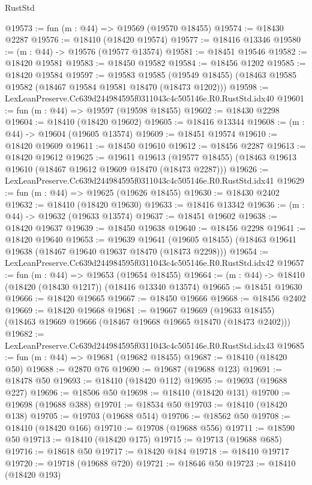 \begin{lexlean}{RustStd}
\begin{coremodule}
@19573 := fun (m : @44) => @19569 (@19570 @18455)
@19574 := @18430 @2287
@19576 := @18410 (@18420 @19574)
@19577 := @18416 @13346
@19580 := (m : @44) -> @19576 (@19577 @13574)
@19581 := @18451 @19546
@19582 := @18420 @19581
@19583 := @18450 @19582
@19584 := @18456 @1202
@19585 := @18420 @19584
@19597 := @19583
    @19585
    (@19549 @18455)
    (@18463 @19585 @19582 (@18467 @19584 @19581 @18470 (@18473 @1202)))
@19598 := LexLeanPreserve.Cc639d244984595f0311043c4c505146e.R0.RustStd.idx40
@19601 := fun (m : @44) => @19597 (@19598 @18455)
@19602 := @18430 @2298
@19604 := @18410 (@18420 @19602)
@19605 := @18416 @13344
@19608 := (m : @44) -> @19604 (@19605 @13574)
@19609 := @18451 @19574
@19610 := @18420 @19609
@19611 := @18450 @19610
@19612 := @18456 @2287
@19613 := @18420 @19612
@19625 := @19611
    @19613
    (@19577 @18455)
    (@18463 @19613 @19610 (@18467 @19612 @19609 @18470 (@18473 @2287)))
@19626 := LexLeanPreserve.Cc639d244984595f0311043c4c505146e.R0.RustStd.idx41
@19629 := fun (m : @44) => @19625 (@19626 @18455)
@19630 := @18430 @2402
@19632 := @18410 (@18420 @19630)
@19633 := @18416 @13342
@19636 := (m : @44) -> @19632 (@19633 @13574)
@19637 := @18451 @19602
@19638 := @18420 @19637
@19639 := @18450 @19638
@19640 := @18456 @2298
@19641 := @18420 @19640
@19653 := @19639
    @19641
    (@19605 @18455)
    (@18463 @19641 @19638 (@18467 @19640 @19637 @18470 (@18473 @2298)))
@19654 := LexLeanPreserve.Cc639d244984595f0311043c4c505146e.R0.RustStd.idx42
@19657 := fun (m : @44) => @19653 (@19654 @18455)
@19664 := (m : @44) -> @18410 (@18420 (@18430 @1217)) (@18416 @13340 @13574)
@19665 := @18451 @19630
@19666 := @18420 @19665
@19667 := @18450 @19666
@19668 := @18456 @2402
@19669 := @18420 @19668
@19681 := @19667
    @19669
    (@19633 @18455)
    (@18463 @19669 @19666 (@18467 @19668 @19665 @18470 (@18473 @2402)))
@19682 := LexLeanPreserve.Cc639d244984595f0311043c4c505146e.R0.RustStd.idx43
@19685 := fun (m : @44) => @19681 (@19682 @18455)
@19687 := @18410 (@18420 @50)
@19688 := @2870 @76
@19690 := @19687 (@19688 @123)
@19691 := @18478 @50
@19693 := @18410 (@18420 @112)
@19695 := @19693 (@19688 @227)
@19696 := @18506 @50
@19698 := @18410 (@18420 @131)
@19700 := @19698 (@19688 @388)
@19701 := @18534 @50
@19703 := @18410 (@18420 @138)
@19705 := @19703 (@19688 @514)
@19706 := @18562 @50
@19708 := @18410 (@18420 @166)
@19710 := @19708 (@19688 @556)
@19711 := @18590 @50
@19713 := @18410 (@18420 @175)
@19715 := @19713 (@19688 @685)
@19716 := @18618 @50
@19717 := @18420 @184
@19718 := @18410 @19717
@19720 := @19718 (@19688 @720)
@19721 := @18646 @50
@19723 := @18410 (@18420 @193)

\end{coremodule}
\end{lexlean}

